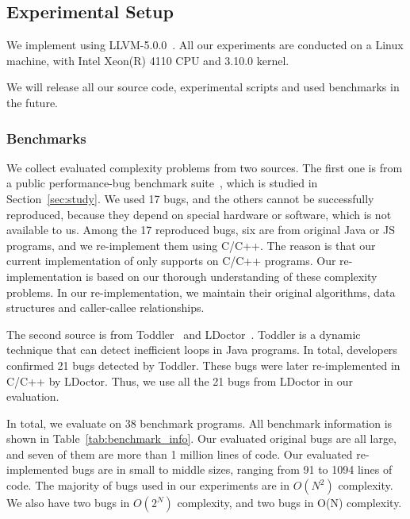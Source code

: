\subsection{Experimental Setup}

We implement \Tool using LLVM-5.0.0~\cite{llvm}. 
All our experiments are conducted on a Linux machine, 
with Intel Xeon(R) 4110 CPU and 3.10.0 kernel.

We will release all our source code, experimental scripts 
and used benchmarks in the future. 




\subsubsection{Benchmarks}

We collect evaluated complexity problems from two sources. 
The first one is
from a public performance-bug benchmark 
suite~\cite{PerfBug,SongOOPSLA2014,ldoctor}, which is
studied in Section~\ref{sec:study}.
We used 17 bugs, and the others cannot be successfully
reproduced, because they depend on special hardware 
or software, which is not available to us. 
Among the 17 reproduced bugs, six are from
original Java or JS programs, 
and we re-implement them using C/C++.
The reason is that our current implementation of \Tool 
only supports on C/C++ programs.
Our re-implementation is based on our thorough 
understanding of these complexity problems.
In our re-implementation, we maintain 
their original algorithms, 
data structures and caller-callee relationships. 


The second source is from Toddler~\cite{Alabama} and LDoctor~\cite{ldoctor}. 
Toddler is a dynamic technique that can detect inefficient loops in Java programs.
In total, developers confirmed 21 bugs detected by Toddler. 
These bugs were later re-implemented in C/C++ by LDoctor. 
Thus, we use all the 21 bugs from LDoctor in our evaluation.  


In total, we evaluate \Tool on 38 benchmark programs. 
All benchmark information is shown in Table~\ref{tab:benchmark_info}. 
Our evaluated original bugs are all large, and seven of them 
are more than 1 million lines of code.
Our evaluated re-implemented bugs are in small to middle sizes, 
ranging from 91 to 1094 lines of code. 
The majority of bugs used in our experiments are in $O(N^2)$ complexity. 
We also have two bugs in $O(2^N)$ complexity, 
and two bugs in O(N) complexity.


